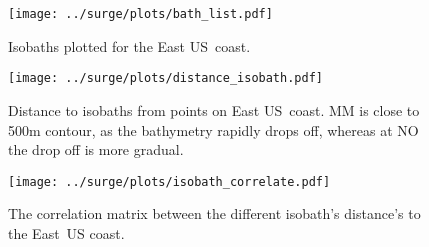 
\begin{figure}[htb!]
\texttt{[image: ../surge/plots/bath\_list.pdf]}
\vspace{-25pt}

\caption{Isobaths plotted for the East US~coast.}
\label{fig:bath}
\texttt{[image: ../surge/plots/distance\_isobath.pdf]}
\vspace{-25pt}

\caption{Distance to isobaths from points on East US~coast. MM is close to 500m
contour, as the bathymetry rapidly drops off, whereas at NO the drop off is more
gradual.}
\label{fig:isobath}
\texttt{[image: ../surge/plots/isobath\_correlate.pdf]}
\vspace{-25pt}

\caption{The correlation matrix between the different isobath's distance's to
the East~US coast.}
\label{fig:isobath}
\end{figure}

